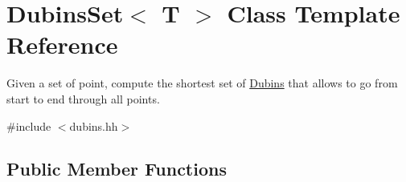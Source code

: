 \hypertarget{class_dubins_set}{}\section{Dubins\+Set$<$ T $>$ Class Template Reference}
\label{class_dubins_set}


Given a set of point, compute the shortest set of \mbox{\hyperlink{class_dubins}{Dubins}} that allows to go from start to end through all points.  




{\ttfamily \#include $<$dubins.\+hh$>$}

\subsection*{Public Member Functions}
